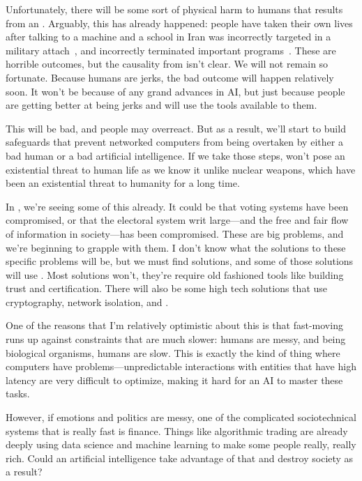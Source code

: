 Unfortunately, there will be some sort of physical harm to humans that
results from an .
%
Arguably, this has already happened: people have taken their own lives
after talking to a machine and a school in Iran was incorrectly targeted
in a military attach~\cite{}, and  incorrectly terminated important programs~\cite{}.
%
These are horrible outcomes, but the causality from  isn't clear.
%
We will not remain so fortunate.
%
Because humans are jerks, the bad outcome will happen relatively
soon. It won't be because of any grand advances in AI, but just
because people are getting better at being jerks and will use the
tools available to them.

This will be bad, and people may overreact. But as a result, we'll
start to build safeguards that prevent networked computers from being
overtaken by either a bad human or a bad artificial intelligence. If we take those steps, 
won't pose an existential threat to human life as we know it unlike
nuclear weapons, which have been an existential threat to humanity for
a long time.

In \currentyear{}, we're seeing some of this already. It could be that
voting systems have been compromised, or that the electoral system
writ large---and the free and fair flow of information in society---has
been compromised. These are big problems, and we're beginning to
grapple with them. I don't know what the solutions to these specific
problems will be, but we must find solutions, and some of those solutions will use .  Most solutions won't, they're require old fashioned tools like building trust and certification.
%
There will also be some high tech solutions that use cryptography, network isolation, and .

One of the reasons that I'm relatively optimistic about this is that
fast-moving  runs up against constraints that are much slower:
humans are messy, and being biological organisms, humans are
slow. This is exactly the kind of thing where computers have
problems---unpredictable interactions with entities that have high
latency are very difficult to optimize, making it hard for an AI to
master these tasks.

However, if emotions and politics are messy, one of the complicated
sociotechnical systems that is really fast is finance.
%
Things like
algorithmic trading are already deeply using data science and machine
learning to make some people really, really rich.
%
Could an artificial
intelligence take advantage of that and destroy society as a result?

